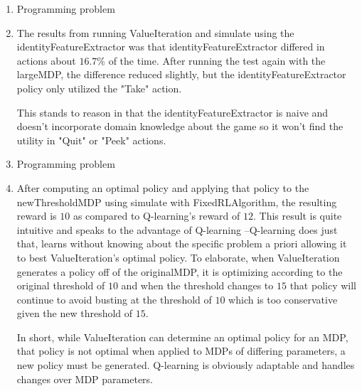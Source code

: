 \documentclass[12pt]{article}
\begin{document}
\begin{enumerate}[label=(\alph*)]
	\item Programming problem

	\item The results from running ValueIteration and simulate using the
		identityFeatureExtractor was that identityFeatureExtractor
		differed in actions about \(16.7\%\) of the time. After
		running the test again with the largeMDP, the difference
		reduced slightly, but the identityFeatureExtractor policy
		only utilized the "Take" action.

		This stands to reason in that the identityFeatureExtractor is naive
		and doesn't incorporate domain knowledge about the game so it
		won't find the utility in "Quit" or "Peek" actions.


	\item Programming problem

	\item After computing an optimal policy and applying that policy to the
		newThresholdMDP using simulate with FixedRLAlgorithm, the resulting
		reward is \(10\) as compared to Q-learning's reward of \(12\). This
		result is quite intuitive and speaks to the advantage of Q-learning
		--Q-learning does just that, learns without knowing about the
		specific problem a priori allowing it to best ValueIteration's optimal
		policy. To elaborate, when ValueIteration generates
		a policy off of the originalMDP, it is optimizing according to the
		original threshold of \(10\) and when the threshold changes to \(15\)
		that policy will continue to avoid busting at the threshold of \(10\)
		which is too conservative given the new threshold of \(15\).

		In short, while ValueIteration can determine an optimal policy for
		an MDP, that policy is not optimal when applied to MDPs
		of differing parameters, a new policy must be generated. Q-learning
		is obviously adaptable and handles changes over MDP parameters.

\end{enumerate}
\end{document}
